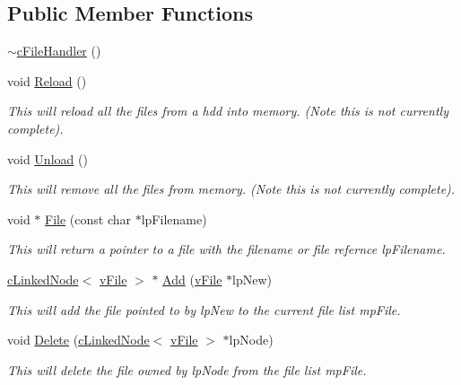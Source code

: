 \subsection*{Public Member Functions}
\begin{DoxyCompactItemize}
\item 
\hyperlink{classc_file_handler_a88dd9099f9332245a2f2fc8a3eb8abc5}{$\sim$cFileHandler} ()
\item 
void \hyperlink{classc_file_handler_a87ff1f0cc36ef46514f77826eaf04453}{Reload} ()
\begin{DoxyCompactList}\small\item\em This will reload all the files from a hdd into memory. (Note this is not currently complete). \item\end{DoxyCompactList}\item 
void \hyperlink{classc_file_handler_a610399fa5d6bdb45de1d3cdc4dcb4c3c}{Unload} ()
\begin{DoxyCompactList}\small\item\em This will remove all the files from memory. (Note this is not currently complete). \item\end{DoxyCompactList}\item 
void $\ast$ \hyperlink{classc_file_handler_a3d2432f40a2d8f2fed223b6ad508b7df}{File} (const char $\ast$lpFilename)
\begin{DoxyCompactList}\small\item\em This will return a pointer to a file with the filename or file refernce lpFilename. \item\end{DoxyCompactList}\item 
\hyperlink{classc_linked_node}{cLinkedNode}$<$ \hyperlink{classv_file}{vFile} $>$ $\ast$ \hyperlink{classc_file_handler_a30b1285eaca092f8417c3f1750f60559}{Add} (\hyperlink{classv_file}{vFile} $\ast$lpNew)
\begin{DoxyCompactList}\small\item\em This will add the file pointed to by lpNew to the current file list mpFile. \item\end{DoxyCompactList}\item 
void \hyperlink{classc_file_handler_a2701aa77518747a401b51e0c38ba1cd1}{Delete} (\hyperlink{classc_linked_node}{cLinkedNode}$<$ \hyperlink{classv_file}{vFile} $>$ $\ast$lpNode)
\begin{DoxyCompactList}\small\item\em This will delete the file owned by lpNode from the file list mpFile. \item\end{DoxyCompactList}\end{DoxyCompactItemize}
